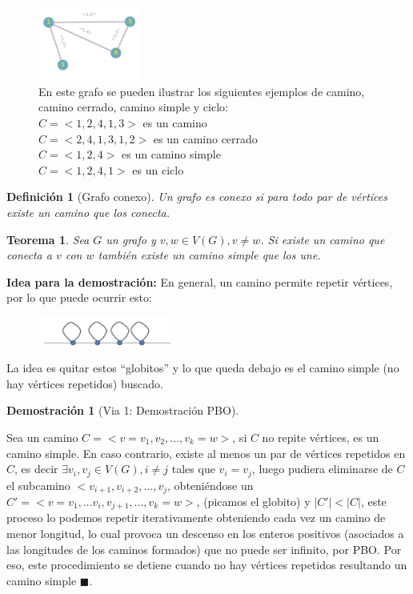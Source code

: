\documentclass[a4paper,1pt]{report}
\newtheorem*{teo}{Teorema}
\newtheorem*{dem}{Demostración}
\newtheorem*{dfn}{Definición}
\begin{document}
\begin{figure}[htb]
    \centering
    \includegraphics[width=0.3\textwidth]{figures/grafo.png}
    \caption{En este grafo se pueden ilustrar los siguientes ejemplos de camino, camino cerrado, camino simple y ciclo: \\ $C = <1,2,4,1,3>$ es un camino \\ $C = <2,4,1,3,1,2> $ es un camino cerrado  \\ $C =<1,2,4>$ es un camino simple \\ $C =<1,2,4,1>$ es un ciclo}
\end{figure}

\begin{dfn}[Grafo conexo]
    Un grafo es conexo si para todo par de vértices existe un camino que los conecta.
\end{dfn}

\begin{teo}
    Sea $G$ un grafo y $v,w \in V(G), v \neq w$. Si existe un camino que conecta a $v$ con $w$ también existe un camino simple que los une.
\end{teo}

\textbf{Idea para la demostración:} En general, un camino permite repetir vértices, por lo que puede ocurrir esto:

\begin{figure}[H]
    \centering
    \includegraphics[width=0.4\textwidth]{figures/camino.png}
\end{figure}
La idea es quitar estos “globitos” y lo que queda debajo es el camino simple (no hay vértices repetidos)
buscado.

\begin{dem}[Via 1: Demostraci\'on PBO]\end{dem}
Sea un camino $C = <v =  v_1,v_2,...,v_k =w>$, si $C$ no repite v\'ertices, es un camino simple. En caso contrario, existe al menos un par de v\'ertices repetidos en $C$, es decir  $\exists v_i, v_j \in V(G), i\neq j$ tales que $v_i = v_j$, luego pudiera eliminarse de $C$ el subcamino $<v_{i+1}, v_{i+2}, ..., v_j$, obteni\'endose un $C' = <v =  v_1,... v_i, v_{j+1}, ...,v_k =w >$, (picamos el globito) y $|C'| < |C|$, este proceso lo podemos repetir iterativamente obteniendo cada vez un camino de menor longitud, lo cual provoca un descenso en los enteros positivos
(asociados a las longitudes de los caminos formados) que no puede ser infinito, por PBO. Por eso, este
procedimiento se detiene cuando no hay vértices repetidos resultando un camino simple $\blacksquare$.
\end{document}
